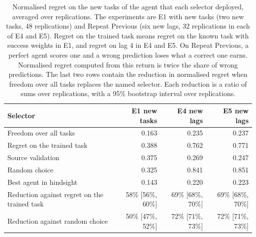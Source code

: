 \begin{table}[t]
\centering
\caption{Normalised regret on the new tasks of the agent that each selector deployed, averaged over replications. The experiments are E1 with new tasks (two new tasks, 48 replications) and Repeat Previous (six new lags, 32 replications in each of E4 and E5). Regret on the trained task means regret on the known task with success weights in E1, and regret on lag 4 in E4 and E5. On Repeat Previous, a perfect agent scores one and a wrong prediction loses what a correct one earns. Normalised regret computed from this return is twice the share of wrong predictions. The last two rows contain the reduction in normalised regret when freedom over all tasks replaces the named selector. Each reduction is a ratio of sums over replications, with a 95\% bootstrap interval over replications.}
\label{tab:reg}
\small
\setlength{\tabcolsep}{3pt}
\begin{tabular}{@{}>{\raggedright\arraybackslash}p{4.3cm}rrr@{}}
\toprule
Selector & E1 new tasks & E4 new lags & E5 new lags \\
\midrule
Freedom over all tasks & 0.163 & 0.235 & 0.237 \\
Regret on the trained task & 0.388 & 0.762 & 0.771 \\
Source validation & 0.375 & 0.269 & 0.247 \\
Random choice & 0.325 & 0.841 & 0.851 \\
Best agent in hindsight & 0.143 & 0.220 & 0.223 \\
\midrule
Reduction against regret on the trained task & 58\% [56\%, 60\%] & 69\% [68\%, 70\%] & 69\% [68\%, 70\%] \\
Reduction against random choice & 50\% [47\%, 52\%] & 72\% [71\%, 73\%] & 72\% [71\%, 73\%] \\
\bottomrule
\end{tabular}
\end{table}
